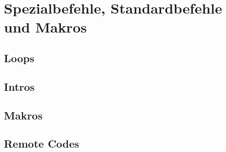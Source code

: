\section{Spezialbefehle, Standardbefehle und Makros}
\subsection{Loops}
\subsection{Intros}
\subsection{Makros}
\subsection{Remote Codes}